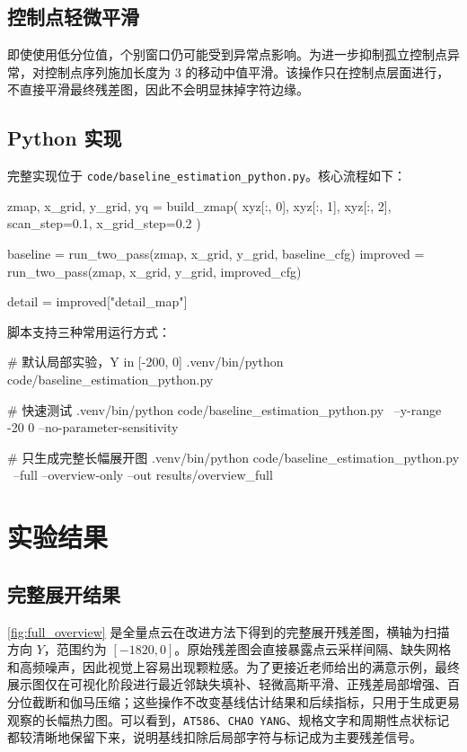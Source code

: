 \documentclass[12pt,hyperref,a4paper,UTF8,fontset=fandol]{ctexart}
\begin{document}
\subsection{控制点轻微平滑}

即使使用低分位值，个别窗口仍可能受到异常点影响。为进一步抑制孤立控制点异常，对控制点序列施加长度为 3 的移动中值平滑。该操作只在控制点层面进行，不直接平滑最终残差图，因此不会明显抹掉字符边缘。

\subsection{Python 实现}

完整实现位于 \texttt{code/baseline\_estimation\_python.py}。核心流程如下：

\begin{python}
zmap, x_grid, y_grid, yq = build_zmap(
    xyz[:, 0], xyz[:, 1], xyz[:, 2],
    scan_step=0.1, x_grid_step=0.2
)

baseline = run_two_pass(zmap, x_grid, y_grid, baseline_cfg)
improved = run_two_pass(zmap, x_grid, y_grid, improved_cfg)

detail = improved["detail_map"]
\end{python}

脚本支持三种常用运行方式：

\begin{python}
# 默认局部实验，Y in [-200, 0]
.venv/bin/python code/baseline_estimation_python.py

# 快速测试
.venv/bin/python code/baseline_estimation_python.py \
    --y-range -20 0 --no-parameter-sensitivity

# 只生成完整长幅展开图
.venv/bin/python code/baseline_estimation_python.py \
    --full --overview-only --out results/overview_full
\end{python}

\section{实验结果}

\subsection{完整展开结果}

\autoref{fig:full_overview} 是全量点云在改进方法下得到的完整展开残差图，横轴为扫描方向 $Y$，范围约为 $[-1820,0]$。原始残差图会直接暴露点云采样间隔、缺失网格和高频噪声，因此视觉上容易出现颗粒感。为了更接近老师给出的满意示例，最终展示图仅在可视化阶段进行最近邻缺失填补、轻微高斯平滑、正残差局部增强、百分位截断和伽马压缩；这些操作不改变基线估计结果和后续指标，只用于生成更易观察的长幅热力图。可以看到，\texttt{AT586}、\texttt{CHAO YANG}、规格文字和周期性点状标记都较清晰地保留下来，说明基线扣除后局部字符与标记成为主要残差信号。
\end{document}
